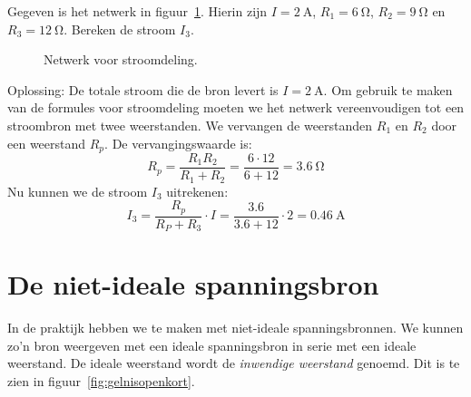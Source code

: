 \begin{example}[Stroomdeling]
Gegeven is het netwerk in figuur~\ref{fig:gelstroomdeling2}. Hierin zijn $I=\SI{2}{\ampere}$, $R_1=\SI{6}{\ohm}$,
$R_2=\SI{9}{\ohm}$ en $R_3=\SI{12}{\ohm}$. Bereken de stroom $I_3$.
\begin{figure}[H]
\centering
{}
\caption{Netwerk voor stroomdeling.}
\label{fig:gelstroomdeling2}
\end{figure}
Oplossing: De totale stroom die de bron levert is $I=\SI{2}{\ampere}$. Om gebruik te maken van de formules
voor stroomdeling moeten we het netwerk vereenvoudigen tot een stroombron met twee weerstanden. We vervangen
de weerstanden $R_1$ en $R_2$ door een weerstand $R_p$. De vervangingswaarde is:
\begin{equation}
R_p = \dfrac{R_1R_2}{R_1+R_2} = \dfrac{6\cdot12}{6+12} = \SI{3.6}{\ohm}
\end{equation}
Nu kunnen we de stroom $I_3$ uitrekenen:
\begin{equation}
I_3 = \dfrac{R_p}{R_P+R_3}\cdot I = \dfrac{\num{3.6}}{\num{3.6}+\num{12}}\cdot \num{2} = \SI{0.46}{\ampere}
\end{equation}
\end{example}


\section{De niet-ideale spanningsbron}
\label{sec:gelnietidealespanningsbron}
In de praktijk hebben we te maken met niet-ideale spanningsbronnen. We kunnen zo'n bron
weergeven met een ideale spanningsbron in serie met een ideale weerstand. De ideale
weerstand wordt de \textsl{inwendige weerstand} genoemd. Dit is te zien in
figuur~\ref{fig:gelnisopenkort}.

